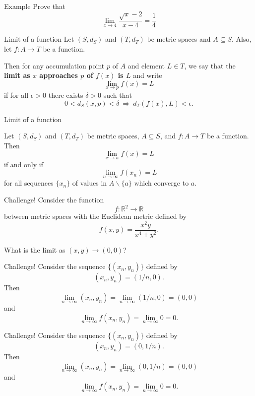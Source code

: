 \documentclass{beamer}
\begin{document}
\begin{frame}{Example}
Prove that
$$\lim_{x\rightarrow 4}\frac{\sqrt{x}-2}{x-4} = \frac{1}{4}$$
\end{frame}

\begin{frame}{Limit of a function}
Let $(S,d_S)$ and $(T,d_T)$ be metric spaces and $A\subseteq S$.
\pause
Also, let $f: A\rightarrow T$ be a function.
\pause
\begin{defn}
\pause
Then for any accumulation point $p$ of $A$ and element $L\in T$, we say that the \textbf{limit as $x$ approaches $p$ of $f(x)$ is $L$}
\pause
 and write
$$\lim_{x\rightarrow p} f(x) = L$$
\pause
if for all $\epsilon > 0$ there exists $\delta > 0$ such that
$$0 < d_S(x,p) < \delta\ \Rightarrow\ d_T(f(x),L) < \epsilon.$$
\end{defn}
\end{frame}

\begin{frame}{Limit of a function}
\begin{thm}
\pause
Let $(S,d_S)$ and $(T,d_T)$ be metric spaces, $A\subseteq S$, and $f: A\rightarrow T$ be a function.
\pause
Then
$$\lim_{x\rightarrow a} f(x) = L$$
\pause
if and only if
$$\lim_{n\rightarrow \infty} f(x_n) = L$$
for all sequences $\{x_n\}$ of values in $A\backslash \{a\}$ which converge to $a$.
\end{thm}
\end{frame}

\begin{frame}{Challenge!}
Consider the function
$$f: \mathbb{R}^2\rightarrow \mathbb R$$
between metric spaces with the Euclidean metric defined by
$$f(x,y) = \frac{x^2y}{x^4+y^2}.$$
\pause
\begin{quest}
\pause
What is the limit as $(x,y)\rightarrow (0,0)$?
\end{quest}
\end{frame}

\begin{frame}{Challenge!}
Consider the sequence $\{(x_n,y_n)\}$ defined by
$$(x_n,y_n) = (1/n,0).$$
\pause
Then
$$\lim_{n\rightarrow \infty} (x_n,y_n) = \lim_{n\rightarrow \infty} (1/n,0) = (0,0)$$
\pause
and
$$\lim_{n\rightarrow \infty} f(x_n,y_n) = \lim_{n\rightarrow \infty} 0 = 0.$$
\end{frame}

\begin{frame}{Challenge!}
Consider the sequence $\{(x_n,y_n)\}$ defined by
$$(x_n,y_n) = (0,1/n).$$
\pause
Then
$$\lim_{n\rightarrow \infty} (x_n,y_n) = \lim_{n\rightarrow \infty} (0,1/n) = (0,0)$$
\pause
and
$$\lim_{n\rightarrow \infty} f(x_n,y_n) = \lim_{n\rightarrow \infty} 0 = 0.$$
\end{frame}
\end{document}
